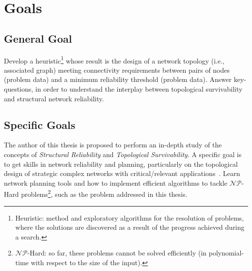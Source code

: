 \section{Goals}
\subsection{General Goal}
Develop a heuristic\footnote{Heuristic: method and exploratory algorithms for the resolution of problems, where the solutions are discovered as a result of the progress achieved during a  search.} whose result is the design of a network topology (i.e., associated graph) meeting 
connectivity requirements between pairs of nodes (problem data) and a minimum reliability threshold 
(problem data). Answer key-questions, in order to understand the interplay 
between topological survivability and structural network reliability.

\subsection{Specific Goals}
The author of this thesis is proposed to perform an in-depth study of the concepts of 
\emph{Structural Reliability} and \emph{Topological Survivability}. 
A specific goal is to get skills in network reliability and planning, particularly on the topological design 
of strategic complex networks with critical/relevant applications~\cite{31}. Learn network planning tools and how to 
implement efficient algorithms to tackle $\mathcal{NP}$-Hard problems\footnote{$\mathcal{NP}$-Hard: so far, these problems cannot be solved efficiently (in polynomial-time with respect to the size of the input).}, such as the problem addressed in this thesis.

